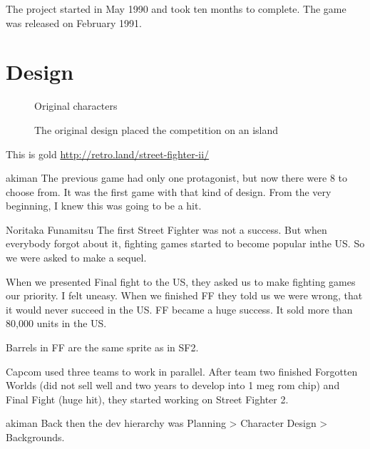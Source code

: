 The project started in May 1990 and took ten months to complete. The game was released on February 1991.






\section{Design}

\begin{figure}[H]
\caption*{Original characters}
\end{figure}

\begin{figure}[H]
\caption*{The original design placed the competition on an island}
\end{figure}

This is gold \url{http://retro.land/street-fighter-ii/}



\begin{q}{akiman\cite{gameMaestro4}}
The previous game had only one protagonist, but now there were 8 to choose from. It was the first game with that kind of design. From the very beginning, I knew this was going to be a hit.
\end{q}


\begin{q}{Noritaka Funamitsu\cite{retro}}
  The first Street Fighter was not a success. But when everybody forgot about it, fighting games started to become popular inthe US. So we were asked to make a sequel.

  When we presented Final fight to the US, they asked us to make fighting games our priority. I felt uneasy. When we finished FF they told us we were wrong, that it would never succeed in the US. FF became a huge success. It sold more than 80,000 units in the US.
\end{q}



Barrels in FF are the same sprite as in SF2.


Capcom used three teams to work in parallel. After team two finished Forgotten Worlds (did not sell well\cite{ar20160331} and two years to develop into 1 meg rom chip) and Final Fight (huge hit), they started working on Street Fighter 2.

\begin{q}{akiman\cite{ar20160331}}
Back then the dev hierarchy was Planning > Character Design > Backgrounds.
\end{q}

